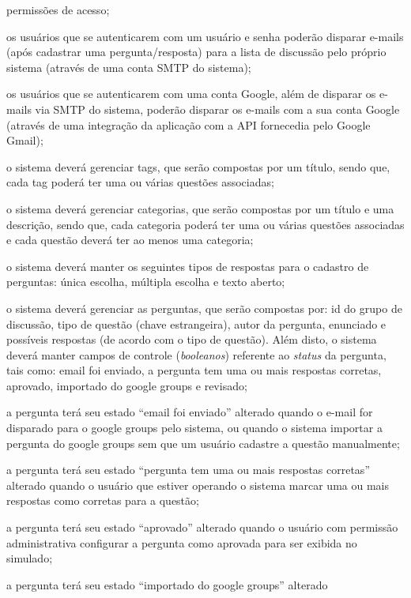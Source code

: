 \begin{alineas}
    permissões de acesso;
    \item os usuários que se autenticarem com um usuário e senha poderão
    disparar e-mails (após cadastrar uma pergunta/resposta) para a lista de
    discussão pelo próprio sistema (através de uma conta SMTP do sistema);
    \item os usuários que se autenticarem com uma conta Google, além de disparar
    os e-mails via SMTP do sistema, poderão disparar os e-mails com a sua conta
    Google (através de uma integração da aplicação com a API fornecedia pelo
    Google Gmail);
    \item o sistema deverá gerenciar tags, que serão compostas por um título,
    sendo que, cada tag poderá ter uma ou várias questões associadas;
    \item o sistema deverá gerenciar categorias, que serão compostas por um
    título e uma descrição, sendo que, cada categoria poderá ter uma ou várias
    questões associadas e cada questão deverá ter ao menos uma categoria;
    \item o sistema deverá manter os seguintes tipos de respostas para o
    cadastro de perguntas: única escolha, múltipla escolha e texto aberto;
    \item o sistema deverá gerenciar as perguntas, que serão compostas por: id
    do grupo de discussão, tipo de questão (chave estrangeira),  autor da
    pergunta, enunciado e possíveis respostas (de acordo com o tipo de questão).
    Além disto, o sistema deverá manter campos de controle (\textit{booleanos})
    referente ao \textit{status} da pergunta, tais como: email foi enviado, a
    pergunta tem uma ou mais respostas corretas, aprovado, importado do google
    groups e revisado;
    \item a pergunta terá seu estado ``email foi enviado'' alterado quando o
    e-mail for disparado para o google groups pelo sistema, ou quando o sistema
    importar a pergunta do google groups sem que um usuário cadastre a questão
    manualmente;
    \item a pergunta terá seu estado ``pergunta tem uma ou mais respostas
    corretas'' alterado quando o usuário que estiver operando o sistema marcar
    uma ou mais respostas como corretas para a questão;
    \item a pergunta terá seu estado ``aprovado'' alterado quando o usuário com
    permissão administrativa configurar a pergunta como aprovada para ser
    exibida no simulado;
    \item a pergunta terá seu estado ``importado do google groups'' alterado

\end{alineas}
